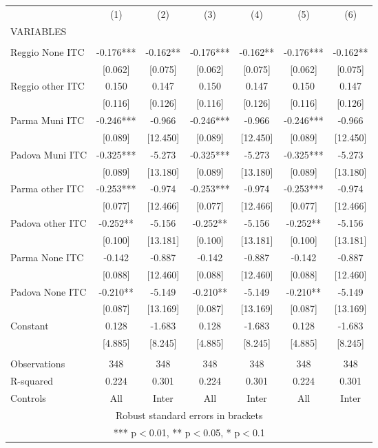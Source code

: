 \begin{tabular}{lcccccc} \hline
 & (1) & (2) & (3) & (4) & (5) & (6) \\
VARIABLES &  &  &  &  &  &  \\ \hline
 &  &  &  &  &  &  \\
Reggio None ITC & -0.176*** & -0.162** & -0.176*** & -0.162** & -0.176*** & -0.162** \\
 & [0.062] & [0.075] & [0.062] & [0.075] & [0.062] & [0.075] \\
Reggio other ITC & 0.150 & 0.147 & 0.150 & 0.147 & 0.150 & 0.147 \\
 & [0.116] & [0.126] & [0.116] & [0.126] & [0.116] & [0.126] \\
Parma Muni ITC & -0.246*** & -0.966 & -0.246*** & -0.966 & -0.246*** & -0.966 \\
 & [0.089] & [12.450] & [0.089] & [12.450] & [0.089] & [12.450] \\
Padova Muni ITC & -0.325*** & -5.273 & -0.325*** & -5.273 & -0.325*** & -5.273 \\
 & [0.089] & [13.180] & [0.089] & [13.180] & [0.089] & [13.180] \\
Parma other ITC & -0.253*** & -0.974 & -0.253*** & -0.974 & -0.253*** & -0.974 \\
 & [0.077] & [12.466] & [0.077] & [12.466] & [0.077] & [12.466] \\
Padova other ITC & -0.252** & -5.156 & -0.252** & -5.156 & -0.252** & -5.156 \\
 & [0.100] & [13.181] & [0.100] & [13.181] & [0.100] & [13.181] \\
Parma None ITC & -0.142 & -0.887 & -0.142 & -0.887 & -0.142 & -0.887 \\
 & [0.088] & [12.460] & [0.088] & [12.460] & [0.088] & [12.460] \\
Padova None ITC & -0.210** & -5.149 & -0.210** & -5.149 & -0.210** & -5.149 \\
 & [0.087] & [13.169] & [0.087] & [13.169] & [0.087] & [13.169] \\
Constant & 0.128 & -1.683 & 0.128 & -1.683 & 0.128 & -1.683 \\
 & [4.885] & [8.245] & [4.885] & [8.245] & [4.885] & [8.245] \\
 &  &  &  &  &  &  \\
Observations & 348 & 348 & 348 & 348 & 348 & 348 \\
R-squared & 0.224 & 0.301 & 0.224 & 0.301 & 0.224 & 0.301 \\
 Controls & All & Inter & All & Inter & All & Inter \\ \hline
\multicolumn{7}{c}{ Robust standard errors in brackets} \\
\multicolumn{7}{c}{ *** p$<$0.01, ** p$<$0.05, * p$<$0.1} \\
\end{tabular}
